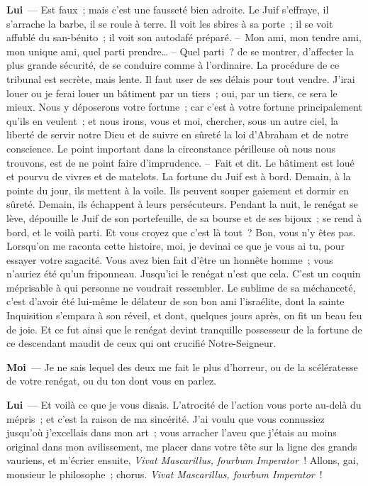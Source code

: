 \documentclass[french,twoside]{book} %
\newcommand{\labelchar}[1]{\textbf{\color{rubric} #1}}
\begin{document}
\labelchar{Lui} — Est faux ; mais c’est une fausseté bien adroite. Le Juif s’effraye, il s’arrache la barbe, il se roule à terre. Il voit les sbires à sa porte ; il se voit affublé du san-bénito ; il voit son autodafé préparé. – Mon ami, mon tendre ami, mon unique ami, quel parti prendre… – Quel parti ? de se montrer, d’affecter la plus grande sécurité, de se conduire comme à l’ordinaire. La procédure de ce tribunal est secrète, mais lente. Il faut user de ses délais pour tout vendre. J’irai louer ou je ferai louer un bâtiment par un tiers ; oui, par un tiers, ce sera le mieux. Nous y déposerons votre fortune ; car c’est à votre fortune principalement qu’ils en veulent ; et nous irons, vous et moi, chercher, sous un autre ciel, la liberté de servir notre Dieu et de suivre en sûreté la loi d’Abraham et de notre conscience. Le point important dans la circonstance périlleuse où nous nous trouvons, est de ne point faire d’imprudence. – Fait et dit. Le bâtiment est loué et pourvu de vivres et de matelots. La fortune du Juif est à bord. Demain, à la pointe du jour, ils mettent à la voile. Ils peuvent souper gaiement et dormir en sûreté. Demain, ils échappent à leurs persécuteurs. Pendant la nuit, le renégat se lève, dépouille le Juif de son portefeuille, de sa bourse et de ses bijoux ; se rend à bord, et le voilà parti. Et vous croyez que c’est là tout ? Bon, vous n’y êtes pas. Lorsqu’on me raconta cette histoire, moi, je devinai ce que je vous ai tu, pour essayer votre sagacité. Vous avez bien fait d’être un honnête homme ; vous n’auriez été qu’un friponneau. Jusqu’ici le renégat n’est que cela. C’est un coquin méprisable à qui personne ne voudrait ressembler. Le sublime de sa méchanceté, c’est d’avoir été lui-même le délateur de son bon ami l’israélite, dont la sainte Inquisition s’empara à son réveil, et dont, quelques jours après, on fit un beau feu de joie. Et ce fut ainsi que le renégat devint tranquille possesseur de la fortune de ce descendant maudit de ceux qui ont crucifié Notre-Seigneur.\par
\labelchar{Moi} — Je ne sais lequel des deux me fait le plus d’horreur, ou de la scélératesse de votre renégat, ou du ton dont vous en parlez.\par
\labelchar{Lui} — Et voilà ce que je vous disais. L’atrocité de l’action vous porte au-delà du mépris ; et c’est la raison de ma sincérité. J’ai voulu que vous connussiez jusqu’où j’excellais dans mon art ; vous arracher l’aveu que j’étais au moins original dans mon avilissement, me placer dans votre tête sur la ligne des grands vauriens, et m’écrier ensuite, \emph{Vivat Mascarillus, fourbum Imperator} ! Allons, gai, monsieur le philosophe ; chorus. \emph{Vivat Mascarillus, fourbum Imperator} !\par
\end{document}
